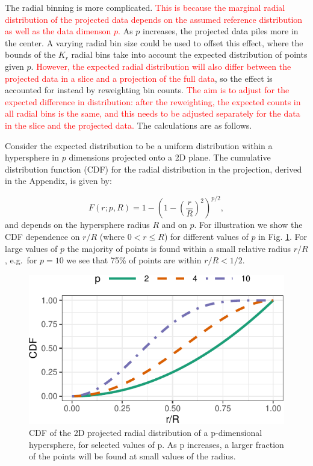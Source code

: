 \documentclass[]{interact}
\theoremstyle{plain}%
\theoremstyle{definition}
\theoremstyle{remark}
\begin{document}
The radial binning is more complicated.
\textcolor{red}{This is because the marginal radial distribution of the projected data depends on the assumed reference distribution as well as the data dimenson $p$.}
As \(p\) increases, the projected data piles more in the center. A
varying radial bin size could be used to offset this effect, where the
bounds of the \(K_r\) radial bins take into account the expected
distribution of points given \(p\).
\textcolor{red}{However, the expected radial distribution will also differ between the projected data in a slice and a projection of the full data},
so the effect is accounted for instead by reweighting bin counts.
\textcolor{red}{The aim is to adjust for the expected difference in distribution: after the reweighting, the expected counts in all radial bins is the same, and this needs to be adjusted separately for the data in the slice and the projected data.}
The calculations are as follows.

Consider the expected distribution to be a uniform distribution within a
hypersphere in \(p\) dimensions projected onto a 2D plane. The
cumulative distribution function (CDF) for the radial distribution in
the projection, derived in the Appendix, is given by:

\begin{equation}
F(r;p,R) = 1-\left(1-\left(\frac{r}{R}\right)^2\right)^{p/2},
\label{eq:cdf}
\end{equation} and depends on the hypersphere radius \(R\) and on \(p\).
For illustration we show the CDF dependence on \(r/R\) (where
\(0<r\leq R\)) for different values of \(p\) in Fig. \ref{fig:cdf}. For
large values of \(p\) the majority of points is found within a small
relative radius \(r/R\), e.g.~for \(p=10\) we see that 75\% of points
are within \(r/R<1/2\).

\begin{figure}

{\centering \includegraphics[width=0.5\linewidth]{section_pursuit_files/figure-latex/cdf-1} 

}

\caption{CDF of the 2D projected radial distribution of a p-dimensional hypersphere, for selected values of p. As p increases, a larger fraction of the points will be found at small values of the radius.}\label{fig:cdf}
\end{figure}
\end{document}
